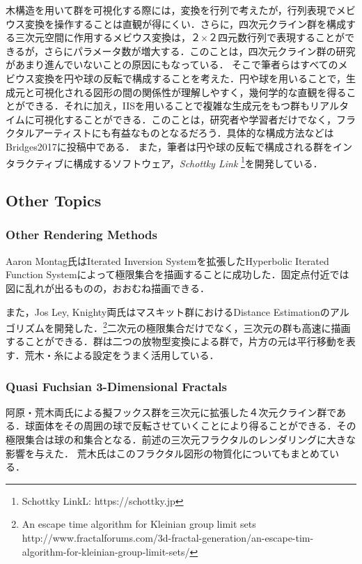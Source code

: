 木構造を用いて群を可視化する際には，変換を行列で考えたが，行列表現でメビウス変換を操作することは直観が得にくい．さらに，四次元クライン群を構成する三次元空間に作用するメビウス変換は，２×２四元数行列で表現することができるが，さらにパラメータ数が増大する．このことは，四次元クライン群の研究があまり進んでいないことの原因にもなっている．
そこで筆者らはすべてのメビウス変換を円や球の反転で構成することを考えた．円や球を用いることで，生成元と可視化される図形の間の関係性が理解しやすく，幾何学的な直観を得ることができる．それに加え，IISを用いることで複雑な生成元をもつ群もリアルタイムに可視化することができる．このことは，研究者や学習者だけでなく，フラクタルアーティストにも有益なものとなるだろう．具体的な構成方法などはBridges2017に投稿中である．
また，筆者は円や球の反転で構成される群をインタラクティブに構成するソフトウェア，{\it Schottky Link} \footnote{Schottky LinkL: https://schottky.jp}を開発している．

\subsection{Other Topics}

\subsubsection{Other Rendering Methods}
Aaron Montag氏はIterated Inversion Systemを拡張したHyperbolic Iterated Function Systemによって極限集合を描画することに成功した\cite{hyperbolicIFS}．固定点付近では図に乱れが出るものの，おおむね描画できる．

また，Jos Ley, Knighty両氏はマスキット群におけるDistance Estimationのアルゴリズムを開発した．\footnote{An escape time algorithm for Kleinian group limit sets http://www.fractalforums.com/3d-fractal-generation/an-escape-tim-algorithm-for-kleinian-group-limit-sets/}二次元の極限集合だけでなく，三次元の群も高速に描画することができる．群は二つの放物型変換による群で，片方の元は平行移動を表す．荒木・糸\cite{maskit}による設定をうまく活用している．

\subsubsection{Quasi Fuchsian 3-Dimensional Fractals}
阿原・荒木両氏による擬フックス群を三次元に拡張した４次元クライン群である\cite{sphairahedra}\cite{sphairahedraJa}．球面体をその周囲の球で反転させていくことにより得ることができる．その極限集合は球の和集合となる．前述の三次元フラクタルのレンダリングに大きな影響を与えた．
荒木氏はこのフラクタル図形の物質化についてもまとめている\cite{materializing}．

